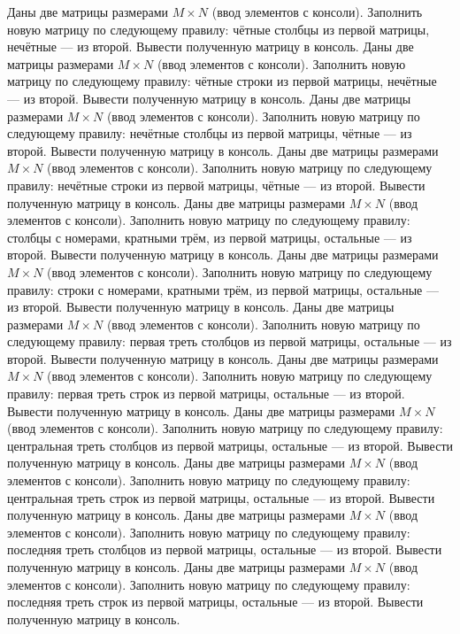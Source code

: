 Даны две матрицы размерами $M \times N$ (ввод элементов с консоли). Заполнить новую матрицу по следующему правилу: чётные столбцы из первой матрицы, нечётные --- из второй. Вывести полученную матрицу в консоль.
Даны две матрицы размерами $M \times N$ (ввод элементов с консоли). Заполнить новую матрицу по следующему правилу: чётные строки из первой матрицы, нечётные --- из второй. Вывести полученную матрицу в консоль.
Даны две матрицы размерами $M \times N$ (ввод элементов с консоли). Заполнить новую матрицу по следующему правилу: нечётные столбцы из первой матрицы, чётные --- из второй. Вывести полученную матрицу в консоль.
Даны две матрицы размерами $M \times N$ (ввод элементов с консоли). Заполнить новую матрицу по следующему правилу: нечётные строки из первой матрицы, чётные --- из второй. Вывести полученную матрицу в консоль.
Даны две матрицы размерами $M \times N$ (ввод элементов с консоли). Заполнить новую матрицу по следующему правилу: столбцы с номерами, кратными трём, из первой матрицы, остальные --- из второй. Вывести полученную матрицу в консоль.
Даны две матрицы размерами $M \times N$ (ввод элементов с консоли). Заполнить новую матрицу по следующему правилу: строки с номерами, кратными трём, из первой матрицы, остальные --- из второй. Вывести полученную матрицу в консоль.
Даны две матрицы размерами $M \times N$ (ввод элементов с консоли). Заполнить новую матрицу по следующему правилу: первая треть столбцов из первой матрицы, остальные --- из второй. Вывести полученную матрицу в консоль.
Даны две матрицы размерами $M \times N$ (ввод элементов с консоли). Заполнить новую матрицу по следующему правилу: первая треть строк из первой матрицы, остальные --- из второй. Вывести полученную матрицу в консоль.
Даны две матрицы размерами $M \times N$ (ввод элементов с консоли). Заполнить новую матрицу по следующему правилу: центральная треть столбцов из первой матрицы, остальные --- из второй. Вывести полученную матрицу в консоль.
Даны две матрицы размерами $M \times N$ (ввод элементов с консоли). Заполнить новую матрицу по следующему правилу: центральная треть строк из первой матрицы, остальные --- из второй. Вывести полученную матрицу в консоль.
Даны две матрицы размерами $M \times N$ (ввод элементов с консоли). Заполнить новую матрицу по следующему правилу: последняя треть столбцов из первой матрицы, остальные --- из второй. Вывести полученную матрицу в консоль.
Даны две матрицы размерами $M \times N$ (ввод элементов с консоли). Заполнить новую матрицу по следующему правилу: последняя треть строк из первой матрицы, остальные --- из второй. Вывести полученную матрицу в консоль.
